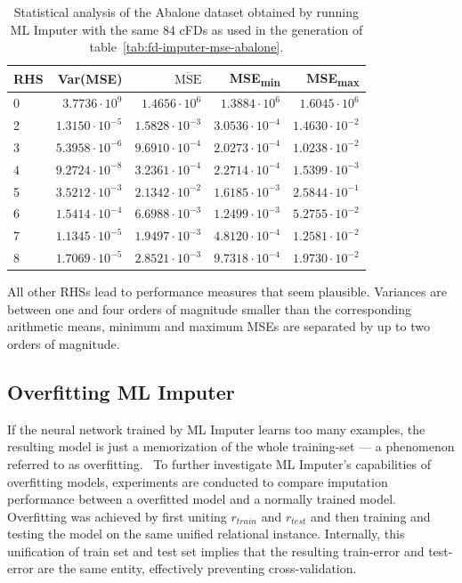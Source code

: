 \begin{table}[ht]
    \centering
    \begin{tabular}{lrrrr}
        \toprule
        \toprule
        RHS & Var(MSE) & \( \overline{\text{MSE}} \) & MSE\textsubscript{min} & MSE\textsubscript{max} \\
        \midrule
        0 & \(3.7736 \cdot 10^{9} \) & \(1.4656 \cdot 10^{6} \) & \(1.3884 \cdot 10^{6} \) & \(1.6045 \cdot 10^{6} \) \\
        2 & \( 1.3150 \cdot 10^{-5} \) & \( 1.5828 \cdot 10^{-3} \) & \( 3.0536 \cdot 10^{-4} \) & \( 1.4630 \cdot 10^{-2} \) \\
        3 & \( 5.3958 \cdot 10^{-6} \) & \( 9.6910 \cdot 10^{-4} \) & \( 2.0273 \cdot 10^{-4} \) & \( 1.0238 \cdot 10^{-2} \) \\
        4 & \( 9.2724 \cdot 10^{-8} \) & \( 3.2361 \cdot 10^{-4} \) & \( 2.2714 \cdot 10^{-4} \) & \( 1.5399 \cdot 10^{-3} \) \\
        5 & \( 3.5212 \cdot 10^{-3} \) & \( 2.1342 \cdot 10^{-2} \) & \( 1.6185 \cdot 10^{-3} \) & \( 2.5844 \cdot 10^{-1} \) \\
        6 & \( 1.5414 \cdot 10^{-4} \) & \( 6.6988 \cdot 10^{-3} \) & \( 1.2499 \cdot 10^{-3} \) & \( 5.2755 \cdot 10^{-2} \) \\
        7 & \( 1.1345 \cdot 10^{-5} \)& \( 1.9497 \cdot 10^{-3} \) & \( 4.8120 \cdot 10^{-4} \) & \( 1.2581 \cdot 10^{-2} \) \\
        8 & \( 1.7069 \cdot 10^{-5} \) & \( 2.8521 \cdot 10^{-3} \) & \( 9.7318 \cdot 10^{-4} \) & \( 1.9730 \cdot 10^{-2} \) \\
        \bottomrule
        \bottomrule
    \end{tabular}
    \caption{Statistical analysis of the Abalone dataset obtained by running ML Imputer with the same 84 cFDs as used in the generation of table~\ref{tab:fd-imputer-mse-abalone}.}\label{tab:ml-imputer-mse-abalone}
\end{table}

All other RHSs lead to performance measures that seem plausible.
Variances are between one and four orders of magnitude smaller than the corresponding arithmetic means, minimum and maximum MSEs are separated by up to two orders of magnitude.

\subsection{Overfitting ML Imputer}
If the neural network trained by ML Imputer learns too many examples, the resulting model is just a memorization of the whole training-set --- a phenomenon referred to as overfitting.~\cite[p.~164]{HAY08}
To further investigate ML Imputer's capabilities of overfitting models, experiments are conducted to compare imputation performance between a overfitted model and a normally trained model.
Overfitting was achieved by first uniting \( r_{train} \) and \( r_{test} \) and then training and testing the model on the same unified relational instance.
Internally, this unification of train set and test set implies that the resulting train-error and test-error are the same entity, effectively preventing cross-validation.

